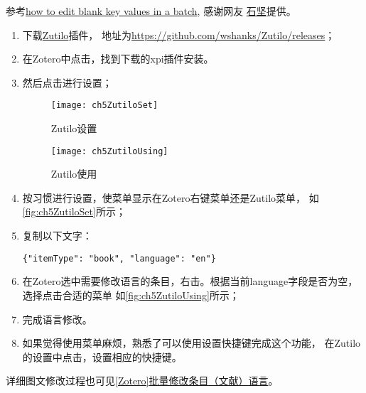 \documentclass[cn,11pt,chinese]{elegantbook}
\begin{document}
\begin{enumerate}
						参考\href{https://forums.zotero.org/discussion/86911/how-to-edit-blank-key-values-in-a-batch#latest}
						{how to edit blank key values in a batch},
						感谢网友 \href{https://www.zhihu.com/people/you-hao-zhai-jian-bu-zhai}{石坚}提供。
					\begin{enumerate}[(1)]
					    \item 下载\href{https://github.com/wshanks/Zutilo/releases}{Zutilo}插件，
						地址为\href{https://github.com/wshanks/Zutilo/releases}
						{https://github.com/wshanks/Zutilo/releases}；
						\item 在Zotero中点击，找到下载的xpi插件安装。
						\item 然后点击进行设置；
						
							\begin{figure}[htbp]
								\centering
								\texttt{[image: ch5ZutiloSet]}
								\caption{Zutilo设置}
								\label{fig:ch5ZutiloSet}
							\end{figure}
							\begin{figure}[htbp]
								\centering
								\texttt{[image: ch5ZutiloUsing]}
								\caption{Zutilo使用}
								\label{fig:ch5ZutiloUsing}
							\end{figure}
						\item 按习惯进行设置，使菜单显示在Zotero右键菜单还是Zutilo菜单，
							如\autoref{fig:ch5ZutiloSet}所示；
						\item 复制以下文字：

						\verb|{"itemType": "book", "language": "en"}|

						\item 在Zotero选中需要修改语言的条目，右击。根据当前language字段是否为空，选择点击合适的菜单
							如\autoref{fig:ch5ZutiloUsing}所示；
						\item 完成语言修改。

						\item 如果觉得使用菜单麻烦，熟悉了可以使用设置快捷键完成这个功能，
						在Zutilo的设置中点击，设置相应的快捷键。
				  \end{enumerate}
		\end{enumerate}
		详细图文修改过程也可见\href{https://zhuanlan.zhihu.com/p/341989158}{[Zotero]批量修改条目（文献）语言}。
	
\end{document}
